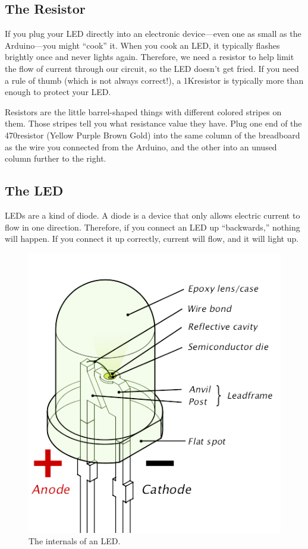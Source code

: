 \subsection{The Resistor}
If you plug your LED directly into an electronic device---even one as small as the Arduino---you might ``cook'' it. When you cook an LED, it typically flashes brightly once and never lights again. Therefore, we need a resistor to help limit the flow of current through our circuit, so the LED doesn't get fried. If you need a rule of thumb (which is not always correct!), a 1K\ohm resistor is typically more than enough to protect your LED.

Resistors are the little barrel-shaped things with different colored stripes on them. Those stripes tell you what resistance value they have. Plug one end of the 470\ohm resistor (Yellow Purple Brown Gold) into the same column of the breadboard as the wire you connected from the Arduino, and the other into an unused column further to the right. 

\subsection{The LED}
LEDs are a kind of diode. A diode is a device that only allows electric current to flow in one direction. Therefore, if you connect an LED up ``backwards,'' nothing will happen. If you connect it up correctly, current will flow, and it will light up. 

\begin{figure}[ht]
  \begin{center}
    \includegraphics[width=0.5\linewidth]{images/ch2-led-internals}
    \caption{The internals of an LED.}
    \label{diagram:ch2-led-internals}
  \end{center}
\end{figure}

